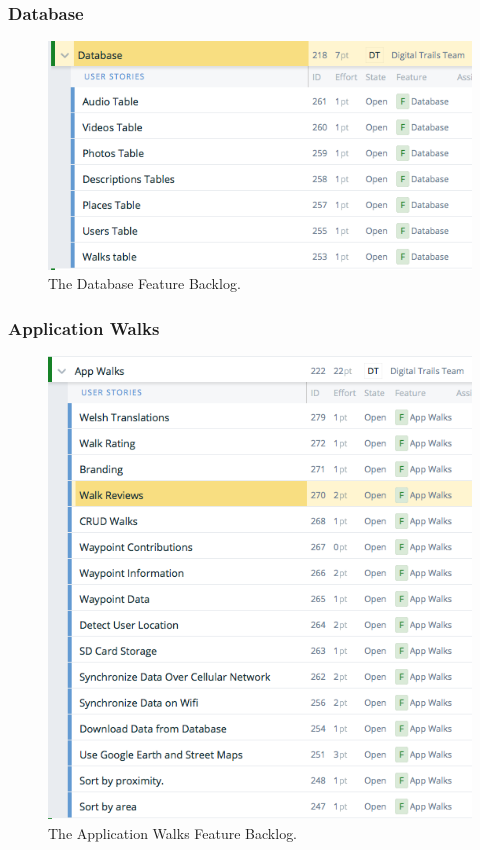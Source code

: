 \documentclass[11pt,a4paper]{article}
\begin{document}
\subsubsection{Database}
\begin{figure}[H]
\centering
\includegraphics[width = 140mm]{backlog/Database.png}
\caption{The Database Feature Backlog.}
\label{fig:backlogDatab}
\end{figure}


\subsubsection{Application Walks}
\begin{figure}[H]
\centering
\includegraphics[width = 140mm]{backlog/AppWalks.png}
\caption{The Application Walks Feature Backlog.}
\label{fig:backlogappwal}
\end{figure}
\end{document}
